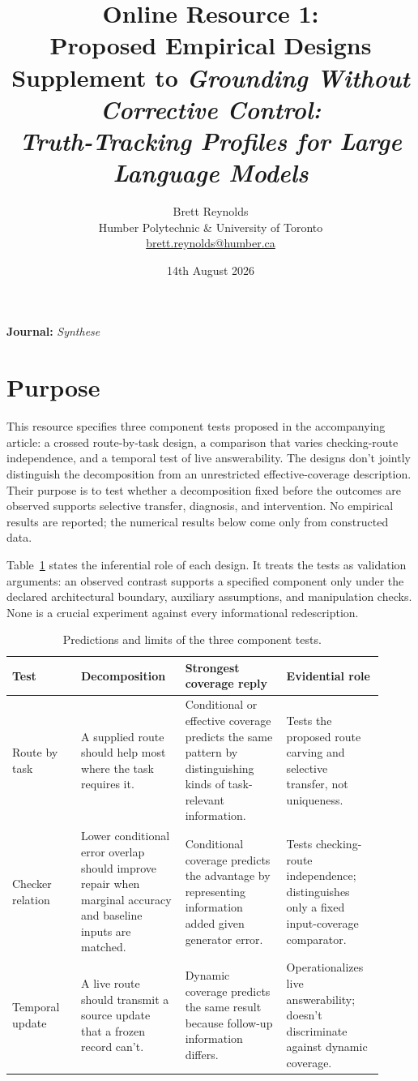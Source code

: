 \documentclass[12pt]{article}
\title{Online Resource 1:\\ Proposed Empirical Designs\\[0.5ex]
\large Supplement to \textit{Grounding Without Corrective Control:\\
Truth-Tracking Profiles for Large Language Models}}
\author{}
\date{}
\author{Brett Reynolds\\
Humber Polytechnic \& University of Toronto\\
\href{mailto:brett.reynolds@humber.ca}{brett.reynolds@humber.ca}}
\date{14th August 2026}
\begin{document}
\maketitle

\noindent\textbf{Journal:} \textit{Synthese}

\section{Purpose}

This resource specifies three component tests proposed in the accompanying article: a
crossed route-by-task design, a comparison that varies checking-route independence, and a
temporal test of live answerability. The designs don't jointly distinguish the decomposition
from an unrestricted effective-coverage description. Their purpose is to test whether a
decomposition fixed before the outcomes are observed supports selective transfer,
diagnosis, and intervention. No empirical results are reported; the numerical results below
come only from constructed data.

Table~\ref{tab:rivals} states the inferential role of each design. It treats the tests as
validation arguments: an observed contrast supports a specified component only under the
declared architectural boundary, auxiliary assumptions, and manipulation checks. None is a
crucial experiment against every informational redescription.

\begin{table}[!t]
\centering
\small
\begin{tabular}{@{}>{\raggedright\arraybackslash}p{0.17\linewidth}>{\raggedright\arraybackslash}p{0.25\linewidth}>{\raggedright\arraybackslash}p{0.25\linewidth}>{\raggedright\arraybackslash}p{0.24\linewidth}@{}}
\toprule
Test & Decomposition & Strongest coverage reply & Evidential role \\
\midrule
Route by task & A supplied route should help most where the task requires it. & Conditional or effective coverage predicts the same pattern by distinguishing kinds of task-relevant information. & Tests the proposed route carving and selective transfer, not uniqueness. \\
Checker relation & Lower conditional error overlap should improve repair when marginal accuracy and baseline inputs are matched. & Conditional coverage predicts the advantage by representing information added given generator error. & Tests checking-route independence; distinguishes only a fixed input-coverage comparator. \\
Temporal update & A live route should transmit a source update that a frozen record can't. & Dynamic coverage predicts the same result because follow-up information differs. & Operationalizes live answerability; doesn't discriminate against dynamic coverage. \\
\bottomrule
\end{tabular}
\caption{Predictions and limits of the three component tests.}
\label{tab:rivals}
\end{table}
\end{document}
